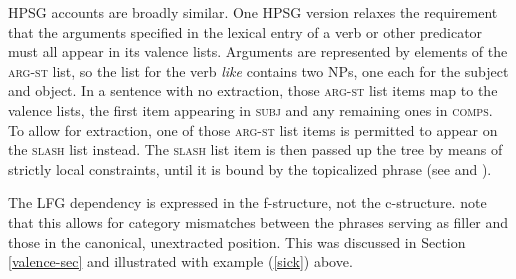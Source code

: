 \noindent
HPSG accounts are broadly similar.  One HPSG version relaxes the requirement that the arguments specified in the lexical entry of a verb or other predicator must all appear in its valence lists.    Arguments are represented by elements of the \textsc{arg-st} list, so the list for the verb \textit{like} contains two NPs, one each for the subject and object.  In a sentence with no extraction, those \textsc{arg-st} list items map to the valence lists, the  first item appearing in \textsc{subj} and any remaining ones in \textsc{comps}.  To allow for extraction, one of those \textsc{arg-st} list items is permitted to appear on the \textsc{slash} list instead.  The \textsc{slash} list item is then passed up the tree by means of strictly local constraints, until it is bound by the topicalized phrase (see  and \citealt{BMS2001a}).   

The LFG dependency is expressed in the f-structure, not the c-structure.  \citet[Chapter 2]{BATW2016a} note that this allows for category mismatches between the phrases serving as filler and those in the canonical, unextracted position.  This was discussed in Section \ref{valence-sec} and illustrated with example (\ref{sick}) above.  
 
